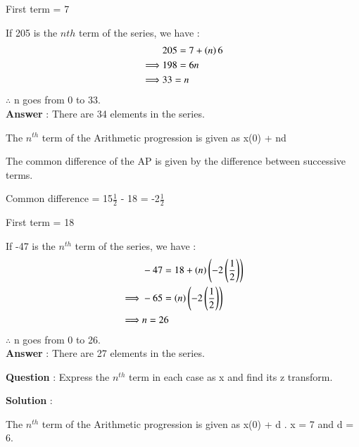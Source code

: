 \documentclass[journal,12pt,twocolumn]{IEEEtran}
\theoremstyle{remark}
\begin{document}
First term  = 7

\vspace{4mm}

If 205 is the $n{th}$ term of the series, we have :
\begin{align}
&205 = 7 + \left(n\right)6\\ 
\implies&  198 = 6n\\
\implies&  33 = n
\end{align}
$\therefore$ n goes from 0 to 33.\\
\large\textbf{Answer} : \normalsize There are 34 elements in the series.

\vspace{4mm}

\textbf{} The $n^{th}$ term of the Arithmetic progression  is given as x(0) + nd

The common difference of the AP is given by the difference between successive terms.

\vspace{4mm}

Common difference  = 15$\frac{1}{2}$ - 18 = -2$\frac{1}{2}$

First term  = 18

\vspace{4mm}

If -47 is the $n^{th}$ term of the series, we have :
\begin{align}
&-47 = 18 + \left(n\right)\left(-2\left(\frac{1}{2}\right)\right)\\ 
\implies& -65 = \left(n\right)\left(-2\left(\frac{1}{2}\right)\right)\\
\implies& n = 26
\end{align} 
$\therefore$ n goes from 0 to 26.\\
\large\textbf{Answer} : \normalsize There are 27 elements in the series.

\vspace{4mm}

\large\textbf{Question} : \normalsize Express the $n^{th}$ term in each case as x and find its z transform.

\vspace{4mm}

\large\textbf{Solution} : \normalsize

\vspace{4mm}

\textbf{} The $n^{th}$ term of the Arithmetic progression is given as x(0) + d . x = 7 and d = 6.
\end{document}
